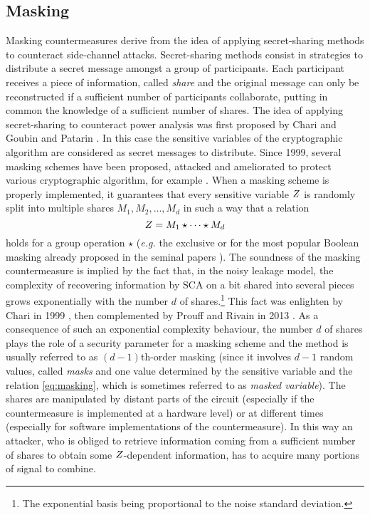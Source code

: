 \subsection{Masking}\label{sec:masking}
Masking countermeasures derive from the idea of applying secret-sharing methods to counteract side-channel attacks. Secret-sharing methods consist in strategies to distribute a secret message amongst a group of participants. Each participant receives a piece of information, called \emph{share} and the original message can only be reconstructed if a sufficient number of participants collaborate, putting in common the knowledge of a sufficient number of shares. The idea of applying secret-sharing to counteract power analysis was first proposed by Chari \etal \cite{chari1999towards} and Goubin and Patarin \cite{goubin1999and}. In this case the sensitive variables of the cryptographic algorithm are considered as secret messages to distribute. Since 1999, several masking schemes have been proposed, attacked and ameliorated to protect various cryptographic algorithm, for example \cite{messerges2000securing,akkar2001implementation,ishai2003private,blomer2004provably,oswald2005side,schramm2006higher,rivain2010provably,moradi2011pushing,coron2013higher,bilgin2014more,de2015higher,goudarzi2017fast,journault2017very}. When a masking scheme is properly implemented, it guarantees that every sensitive variable $Z$ is randomly split  into multiple shares $M_1,M_2,\dots,M_d$ in such a way that a relation 
\begin{equation}\label{eq:masking}
Z = M_1 \star \dots \star M_d
\end{equation}  holds for a group operation $\star$ (\emph{e.g.} the exclusive or for the most popular Boolean masking already proposed in the seminal papers \cite{chari1999towards,goubin1999and}). The soundness of the masking countermeasure is implied by the fact that, in the noisy leakage model, the complexity of recovering information by SCA on a bit shared into several pieces grows exponentially with the number $d$ of shares.\footnote{The exponential basis being proportional to the noise standard deviation.} This fact was enlighten by Chari \etal in 1999  \cite{chari1999towards}, then complemented by Prouff and Rivain in 2013 \cite{prouff2013masking}. As a consequence of such an exponential complexity behaviour, the number $d$ of shares plays the role of a security parameter for a masking scheme and the method is usually referred to as $(d-1)$th-order masking (since it involves $d-1$ random values, called \emph{masks} and one value determined by the sensitive variable and the relation \eqref{eq:masking}, which is sometimes referred to as \emph{masked variable}). The shares are manipulated by distant parts of the circuit (especially if the countermeasure is implemented at a hardware level) or at different times (especially for software implementations of the countermeasure). In this way an attacker, who is obliged to retrieve information coming from a sufficient number of shares to obtain some $Z$-dependent information, has to acquire many portions of signal to combine. \\

